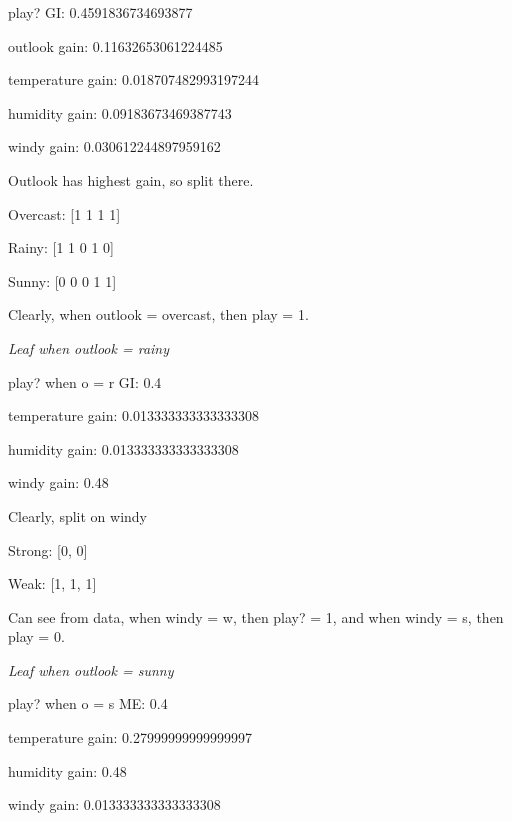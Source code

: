 \documentclass[12pt, fullpage,letterpaper]{article}
\begin{document}
\begin{enumerate}
\begin{enumerate}
	play? GI:  0.4591836734693877
	
    outlook gain: 0.11632653061224485
    
    temperature gain: 0.018707482993197244
    
    humidity gain: 0.09183673469387743
    
    windy gain: 0.030612244897959162
    
    \vspace{5mm}
    
    Outlook has highest gain, so split there.
    
    \vspace{5mm}

    Overcast: [1 1 1 1]

    Rainy: [1 1 0 1 0]

    Sunny: [0 0 0 1 1]

    Clearly, when outlook = overcast, then play = 1.
    
    \vspace{5mm}
    
    \emph{Leaf when outlook = rainy}
    
    play? when o = r GI:  0.4
    
    temperature gain: 0.013333333333333308
    
    humidity gain: 0.013333333333333308
    
    windy gain: 0.48
    
    \vspace{5mm}

    Clearly, split on windy
    
    \vspace{5mm}

    Strong: [0, 0]
    
    Weak: [1, 1, 1]
    
    \vspace{5mm}
    
    Can see from data, when windy = w, then play? = 1, and when windy = s, then play = 0.
    
    \vspace{5mm}
    
    \emph{Leaf when outlook = sunny}
    
    play? when o = s ME:  0.4
    
    temperature gain: 0.27999999999999997
    
    humidity gain: 0.48
    
    windy gain: 0.013333333333333308


\end{enumerate}
\end{enumerate}
\end{document}
